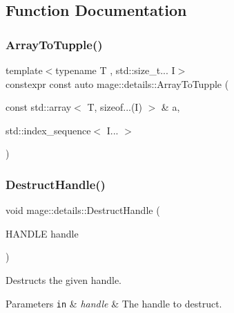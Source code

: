 \subsection{Function Documentation}
\mbox{\label{namespacemage_1_1details_a282e14de1d24b9f356912f8ac3bb868d}} 
\subsubsection{\texorpdfstring{Array\+To\+Tupple()}{ArrayToTupple()}}
{\footnotesize\ttfamily template$<$typename T , std\+::size\+\_\+t... I$>$ \\
constexpr const auto mage\+::details\+::\+Array\+To\+Tupple (\begin{DoxyParamCaption}\item[{const std\+::array$<$ T, sizeof...(I) $>$ \&}]{a,  }\item[{std\+::index\+\_\+sequence$<$ I... $>$}]{ }\end{DoxyParamCaption})\hspace{0.3cm}{\ttfamily [noexcept]}}

\mbox{\label{namespacemage_1_1details_a213580128442b2980ad4c3c82bf80ee8}} 
\subsubsection{\texorpdfstring{Destruct\+Handle()}{DestructHandle()}}
{\footnotesize\ttfamily void mage\+::details\+::\+Destruct\+Handle (\begin{DoxyParamCaption}\item[{H\+A\+N\+D\+LE}]{handle }\end{DoxyParamCaption})\hspace{0.3cm}{\ttfamily [noexcept]}}

Destructs the given handle.


\begin{DoxyParams}[1]{Parameters}
\mbox{\tt in}  & {\em handle} & The handle to destruct. \\
\hline
\end{DoxyParams}
\mbox{\label{namespacemage_1_1details_af8daa2a877610f68e45c4ac35c69dc06}} 

